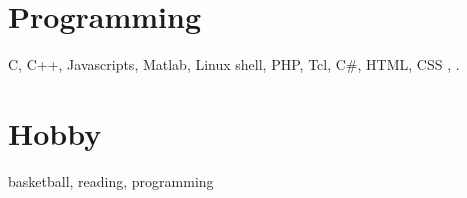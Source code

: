 \documentclass[margin,line]{resume}
\begin{document}
\begin{resume}

	\section{\mysidestyle Programming} 

	C, C++, Javascripts, Matlab, Linux shell, PHP, Tcl, C\#, HTML, CSS , \LaTeXe.

	\section{\mysidestyle Hobby} 

	basketball, reading, programming
\end{resume}
\end{document}
